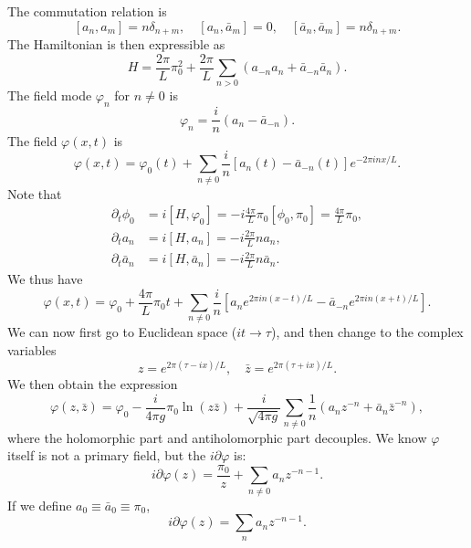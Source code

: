 \documentclass[aps,prb,superscriptaddress,nofootinbib]{revtex4}
\begin{document}
The commutation relation is
\begin{equation}
	\left[a_{n}, a_{m}\right]=n \delta_{n+m}, \quad
	\left[a_{n}, \bar{a}_{m}\right]=0, \quad
	\left[\bar{a}_{n}, \bar{a}_{m}\right]=n \delta_{n+m}.
\end{equation}
The Hamiltonian is then expressible as
\begin{equation}
	H=\frac{2\pi}{L} \pi_{0}^{2}+\frac{2 \pi}{L} \sum_{n > 0}\left(a_{-n} a_{n}+\bar{a}_{-n} \bar{a}_{n}\right).
\end{equation}
The field mode $\varphi_n$ for $n\ne 0$ is
\begin{equation}
	\varphi_n = \frac{i}{n} (a_n-\bar a_{-n}).
\end{equation}
The field $\varphi(x,t)$ is
\begin{equation}
	\varphi(x,t) = \varphi_0(t) + \sum_{n\ne 0} \frac{i}{n} \left[a_n(t)-\bar a_{-n}(t)\right] e^{-2\pi i n x/L}.
\end{equation}
Note that
\begin{equation}
\begin{aligned}
	\partial_t \phi_0 &= i [H,\varphi_0] = -i\frac{4\pi}{L} \pi_0 [\phi_0, \pi_0] = \frac{4\pi}{L}\pi_0, \\
	\partial_t a_n &= i[H, a_n] = -i \frac{2\pi}{L} n a_n, \\
	\partial_t \bar a_n &= i[H, \bar a_n] = -i \frac{2\pi}{L} n \bar a_n.
\end{aligned}
\end{equation}
We thus have
\begin{equation}
	\varphi(x, t)=\varphi_{0}+\frac{4\pi}{L} \pi_{0} t + \sum_{n \neq 0} \frac{i}{n}\left[a_{n} e^{2 \pi i n(x-t) / L}-\bar{a}_{-n} e^{2 \pi i n(x+t) / L}\right].
\end{equation}
We can now first go to Euclidean space ($it \rightarrow \tau$), and then change to the complex variables
\begin{equation}
	z = e^{2\pi(\tau-ix)/L},\quad
	\bar z = e^{2\pi(\tau+ix)/L}.
\end{equation}
We then obtain the expression
\begin{equation}
	\varphi(z, \bar{z})=\varphi_{0}-\frac{i}{4 \pi g} \pi_{0} \ln (z \bar{z})+\frac{i}{\sqrt{4 \pi g}} \sum_{n \neq 0} \frac{1}{n}\left(a_{n} z^{-n}+\bar{a}_{n} \bar{z}^{-n}\right),
\end{equation}
where the holomorphic part and antiholomorphic part decouples.
We know $\varphi$ itself is not a primary field, but the $i\partial\varphi$ is:
\begin{equation}
	i\partial\varphi(z) = \frac{\pi_0}{z} + \sum_{n\ne 0} a_n z^{-n-1}.
\end{equation}
If we define $a_0 \equiv \bar a_0 \equiv \pi_0$,
\begin{equation}
	i\partial\varphi(z) = \sum_n a_n z^{-n-1}.
\end{equation}
\end{document}
